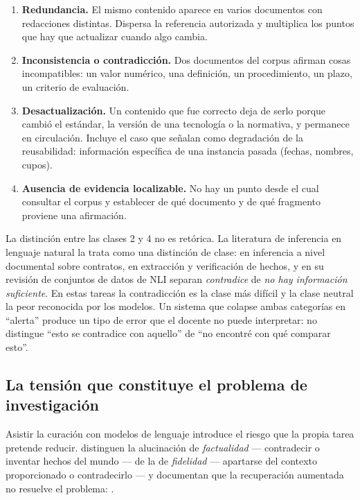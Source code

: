 \begin{enumerate}
  \item \textbf{Redundancia.} El mismo contenido aparece en varios documentos con
        redacciones distintas. Dispersa la referencia autorizada y multiplica los
        puntos que hay que actualizar cuando algo cambia.
  \item \textbf{Inconsistencia o contradicción.} Dos documentos del corpus afirman
        cosas incompatibles: un valor numérico, una definición, un procedimiento, un
        plazo, un criterio de evaluación.
  \item \textbf{Desactualización.} Un contenido que fue correcto deja de serlo
        porque cambió el estándar, la versión de una tecnología o la normativa, y
        permanece en circulación. Incluye el caso que
        \textcite{leacock2007framework} señalan como degradación de la reusabilidad:
        información específica de una instancia pasada (fechas, nombres, cupos).
  \item \textbf{Ausencia de evidencia localizable.} No hay un punto desde el cual
        consultar el corpus y establecer de qué documento y de qué fragmento
        proviene una afirmación.
\end{enumerate}

La distinción entre las clases 2 y 4 no es retórica. La literatura de inferencia en
lenguaje natural la trata como una distinción de clase: \textcite{koreeda2021contractnli}
en inferencia a nivel documental sobre contratos, \textcite{thorne2018fever} en
extracción y verificación de hechos, y \textcite{gubelmann2024capturing} en su
revisión de conjuntos de datos de NLI separan \emph{contradice} de
\emph{no hay información suficiente}. En estas tareas la contradicción es la clase
más difícil y la clase neutral la peor reconocida por los modelos. Un sistema que
colapse ambas categorías en \enquote{alerta} produce un tipo de error que el docente
no puede interpretar: no distingue \enquote{esto se contradice con aquello} de
\enquote{no encontré con qué comparar esto}.

\subsection{La tensión que constituye el problema de investigación}
\label{sec:problema-tension}

Asistir la curación con modelos de lenguaje introduce el riesgo que la propia tarea
pretende reducir. \textcite{huang2025survey} distinguen la alucinación de
\emph{factualidad} --- contradecir o inventar hechos del mundo --- de la de
\emph{fidelidad} --- apartarse del contexto proporcionado o contradecirlo --- y
documentan que la recuperación aumentada no resuelve el problema:
.

